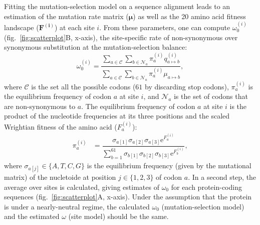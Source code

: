 \documentclass{article}
\newcommand{\UniDimArray}[1]{\bm{#1}}
\newcommand{\e}{\mathrm{e}}
\begin{document}
    Fitting the mutation-selection model on a sequence alignment leads to an estimation of the mutation rate matrix ($\UniDimArray{\mu}$) as well as the 20 amino acid fitness landscape ($\UniDimArray{F^{(i)}}$) at each site $i$.
    From these parameters, one can compute $\omega_{0}^{(i)}$ (fig.~\ref{fig:scatterplot}B, x-axis), the site-specific rate of non-synonymous over synonymous substitution at the mutation-selection balance:
    \begin{equation}
        \omega_{0}^{(i)} = \dfrac{\sum_{a \in \mathcal{C}} \sum_{b \in \mathcal{N}_a} \pi_a^{(i)} q_{a \mapsto b}^{(i)}}{\sum_{a \in \mathcal{C}} \sum_{b \in \mathcal{N}_a} \pi_a^{(i)} \mu_{a \mapsto b}},
    \end{equation}
    where $\mathcal{C}$ is the set all the possible codons ($61$ by discarding stop codons), $\pi_a^{(i)}$ is the equilibrium frequency of codon $a$ at site $i$, and $\mathcal{N}_a$ is the set of codons that are non-synonymous to $a$\cite{spielman_relationship_2015, rodrigue_detecting_2017}.
    The equilibrium frequency of codon $a$ at site $i$ is the product of the nucleotide frequencies at its three positions and the scaled Wrightian fitness of the amino acid ($F_a^{(i)}$):
    \begin{align}
        \pi_a^{(i)} & = \dfrac{ \sigma_{a[1]}\sigma_{a[2]}\sigma_{a[3]} \e^{F_a^{(i)}}}{\sum\limits_{b=1}^{61}\sigma_{b[1]}\sigma_{b[2]}\sigma_{b[3]} \e^{F_b^{(i)}} },
    \end{align}
    where $\sigma_{a[j]} \in \{A, T, C, G\}$ is the equilibrium frequency (given by the mutational matrix) of the nucletoide at position $j \in \{1, 2, 3\}$ of codon $a$.
    In a second step, the average over sites is calculated, giving estimates of $\omega_{0}$ for each protein-coding sequences (fig.~\ref{fig:scatterplot}A, x-axis).
    Under the assumption that the protein is under a nearly-neutral regime, the calculated $\omega_{0}$ (mutation-selection model) and the estimated $\omega$ (site model) should be the same\cite{spielman_relationship_2015}.
\end{document}
